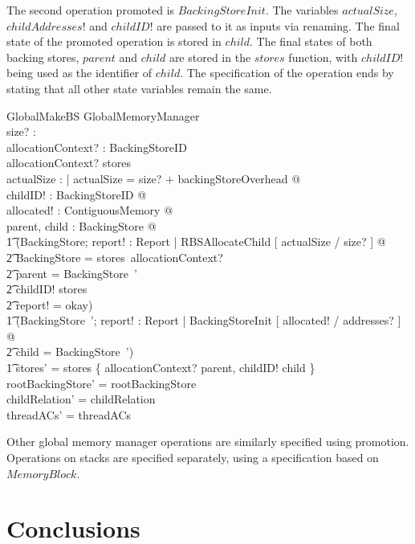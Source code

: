 \documentclass[a4paper,10pt]{report}
\begin{document}
The second operation promoted is $BackingStoreInit$. The variables
$actualSize$, $childAddresses!$ and $childID!$ are passed to it as inputs via
renaming. The final state of the promoted operation is stored in $child$.  The final 
states of both backing stores, $parent$ and $child$ are stored in the $stores$
function, with $childID!$ being used as the identifier of $child$. The 
specification of the operation ends by stating that all other state variables
remain the same.
%
\begin{schema}{GlobalMakeBS}
  \Delta GlobalMemoryManager \\
  size? : \nat \\
  allocationContext? : BackingStoreID \\
\where
  allocationContext? \in \dom stores \\
  \exists actualSize : \nat | actualSize = size? + backingStoreOverhead @ \\
  \exists childID! : BackingStoreID @ \\
  \exists allocated! : ContiguousMemory @ \\
  \exists parent, child : BackingStore @ \\
  \t1 (\exists \Delta BackingStore; report! : Report | RBSAllocateChild [ actualSize / size? ] @ \\
    \t2 \theta BackingStore = stores~allocationContext? \land \\
    \t2 parent = \theta BackingStore~' \land \\
    \t2 childID! \notin \dom stores \land \\
    \t2 report! = okay) \land \\
  \t1 (\exists BackingStore~'; report! : Report | BackingStoreInit [ allocated! / addresses? ] @ \\
    \t2 child = \theta BackingStore~') \land \\
  \t1 stores' = stores \oplus \{ allocationContext? \mapsto parent, childID! \mapsto child \} \\
  rootBackingStore' = rootBackingStore \\
  childRelation' = childRelation \\
  threadACs' = threadACs \\
\end{schema}
%
Other global memory manager operations are similarly specified using
promotion. Operations on stacks are specified separately, using a
specification based on $MemoryBlock$.

\chapter{Conclusions}
\label{conclusions-chapter}


\raggedright
\printbibliography
\end{document}
